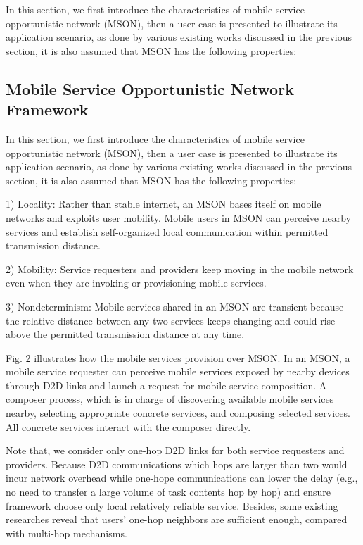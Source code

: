 \documentclass[10pt,journal,compsoc]{IEEEtran}
\begin{document}
In this section, we first introduce the characteristics of mobile service opportunistic network (MSON), then a user case is presented to illustrate its application scenario, as done by various existing works discussed in the previous section, it is also assumed that MSON has the following properties:

\subsection{Mobile Service Opportunistic Network Framework}
In this section, we first introduce the characteristics of mobile service opportunistic network (MSON), then a user case is presented to illustrate its application scenario, as done by various existing works discussed in the previous section, it is also assumed that MSON has the following properties:

1) Locality: Rather than stable internet, an MSON bases itself on mobile networks and exploits user mobility. Mobile users in MSON can perceive nearby services and establish self-organized local communication within permitted transmission distance.

2) Mobility: Service requesters and providers keep moving in the mobile network even when they are invoking or provisioning mobile services.

3) Nondeterminism: Mobile services shared in an MSON are transient because the relative distance between any two services keeps changing and could rise above the permitted transmission distance at any time. 

Fig. 2 illustrates how the mobile services provision over MSON. In an MSON, a mobile service requester can perceive mobile services exposed by nearby devices through D2D links and launch a request for mobile service composition. A composer process, which is in charge of discovering available mobile services nearby, selecting appropriate concrete services, and composing selected services. All concrete services interact with the composer directly.

Note that, we consider only one-hop D2D links for both service requesters and providers. 
Because D2D communications which hops are larger than two would incur network overhead \cite{li2014can} while one-hope communications can lower the delay (e.g., no need to transfer a large volume of task contents hop by hop) and ensure framework choose only local relatively reliable service. 
Besides, some existing researches \cite{chang2015progressive,tuncay2013participant,wu2013homing,jiang2016exploiting,liu2013exploring} reveal that users' one-hop neighbors are sufficient enough, compared with multi-hop mechanisms.
\end{document}
